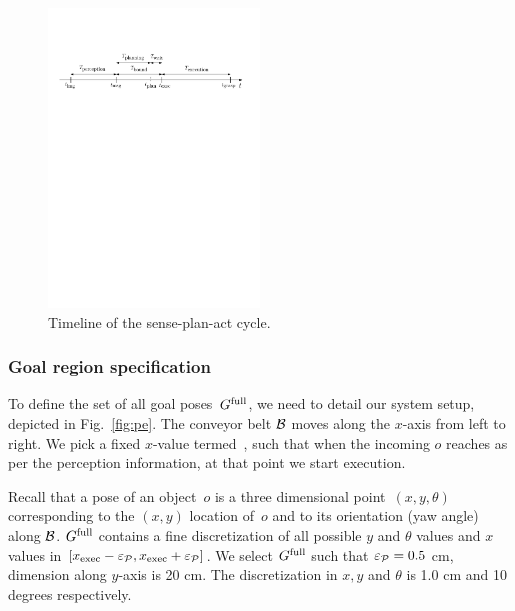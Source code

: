 \documentclass[conference]{IEEEtran}
\begin{document}
\begin{figure}[t]
    \centering
    \includegraphics[width=0.5\textwidth]{figs/timeline2.pdf}
    \caption{\CaptionTextSize Timeline of the sense-plan-act cycle.}
    \label{fig:tl}
\end{figure}

\subsubsection{Goal region specification}
To define the set of all goal poses~$G^{\textrm{full}}$, we need to detail our system setup, depicted in Fig.~\ref{fig:pe}.
The conveyor belt $\mathcal{B}$ moves along the $x$-axis from left to right.
We pick a fixed $x$-value termed~\Xexec, such that when the incoming $o$ reaches \Xexec as per the perception information, at that point we start execution.

%
Recall that a pose of an object~$o$ is a three dimensional point~$(x,y,\theta)$ corresponding to the $(x,y)$ location of~$o$ and to its orientation (yaw angle) along $\mathcal{B}$.
%
$G^{\textrm{full}}$ contains a fine discretization of all possible $y$ and $\theta$ values and $x$ values in  $[x_{\textrm{exec}}-\varepsilon_\mathcal{P}, x_{\textrm{exec}}+\varepsilon_\mathcal{P}]$.
We select $G^{\textrm{full}}$ such that $\varepsilon_\mathcal{P} = 0.5$ cm, dimension along $y$-axis is 20 cm. The discretization in $x,y$ and $\theta$ is 1.0 cm and 10 degrees respectively.
\end{document}
